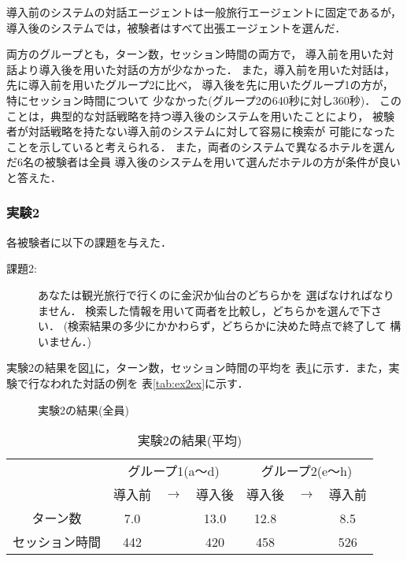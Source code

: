 導入前のシステムの対話エージェントは一般旅行エージェントに固定であるが，
導入後のシステムでは，被験者はすべて出張エージェントを選んだ．

両方のグループとも，ターン数，セッション時間の両方で，
導入前を用いた対話より導入後を用いた対話の方が少なかった．
また，導入前を用いた対話は，先に導入前を用いたグループ2に比べ，
導入後を先に用いたグループ1の方が，特にセッション時間について
少なかった(グループ2の640秒に対し360秒)．
このことは，典型的な対話戦略を持つ導入後のシステムを用いたことにより，
被験者が対話戦略を持たない導入前のシステムに対して容易に検索が
可能になったことを示していると考えられる．
また，両者のシステムで異なるホテルを選んだ6名の被験者は全員
導入後のシステムを用いて選んだホテルの方が条件が良いと答えた．

\subsubsection{実験2}

各被験者に以下の課題を与えた．
\begin{description}
\item[課題2:] あなたは観光旅行で行くのに金沢か仙台のどちらかを
選ばなければなりません．
検索した情報を用いて両者を比較し，どちらかを選んで下さい．
(検索結果の多少にかかわらず，どちらかに決めた時点で終了して
構いません．)
\end{description}

実験2の結果を図\ref{fig:exam2}に，ターン数，セッション時間の平均を
表\ref{tab:mtexam2}に示す．また，実験で行なわれた対話の例を
表\ref{tab:ex2ex}に示す．

\begin{figure}[htbp]
\begin{center}
\end{center}
\caption{実験2の結果(全員)}\label{fig:exam2}
\end{figure}

\begin{table}[htp]
\caption{実験2の結果(平均)}\label{tab:mtexam2}
\centering \bigskip
\begin{tabular}{c|ccc|ccc}
\hline \hline
&\multicolumn{3}{c|}{グループ1(a〜d)} &
\multicolumn{3}{c}{グループ2(e〜h)}\\
& 導入前 & $\rightarrow$ & 導入後 &
導入後 & $\rightarrow$ & 導入前\\ \hline
ターン数 & 7.0 & & 13.0 & 12.8 & & 8.5\\
セッション時間 & 442 & & 420 & 458 & & 526\\
\hline \hline
\end{tabular}
\end{table}

